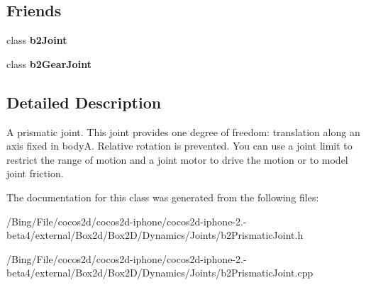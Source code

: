 \subsection*{Friends}
\begin{DoxyCompactItemize}
\item 
\hypertarget{classb2_prismatic_joint_a54ade8ed3d794298108d7f4c4e4793fa}{class {\bfseries b2\-Joint}}\label{classb2_prismatic_joint_a54ade8ed3d794298108d7f4c4e4793fa}

\item 
\hypertarget{classb2_prismatic_joint_a13c275221e30bb485e17e4e04553cb71}{class {\bfseries b2\-Gear\-Joint}}\label{classb2_prismatic_joint_a13c275221e30bb485e17e4e04553cb71}

\end{DoxyCompactItemize}


\subsection{Detailed Description}
A prismatic joint. This joint provides one degree of freedom\-: translation along an axis fixed in body\-A. Relative rotation is prevented. You can use a joint limit to restrict the range of motion and a joint motor to drive the motion or to model joint friction. 

The documentation for this class was generated from the following files\-:\begin{DoxyCompactItemize}
\item 
/\-Bing/\-File/cocos2d/cocos2d-\/iphone/cocos2d-\/iphone-\/2.-\/beta4/external/\-Box2d/\-Box2\-D/\-Dynamics/\-Joints/b2\-Prismatic\-Joint.\-h\item 
/\-Bing/\-File/cocos2d/cocos2d-\/iphone/cocos2d-\/iphone-\/2.-\/beta4/external/\-Box2d/\-Box2\-D/\-Dynamics/\-Joints/b2\-Prismatic\-Joint.\-cpp\end{DoxyCompactItemize}
